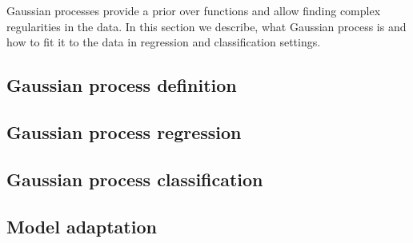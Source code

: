 Gaussian processes provide a prior over functions and allow finding complex regularities in the data. In this section we describe, what Gaussian process is and how to fit it to the data in regression and classification settings.

\subsection{Gaussian process definition}
	
\subsection{Gaussian process regression}
	
\subsection{Gaussian process classification}
	
\subsection{Model adaptation}
	